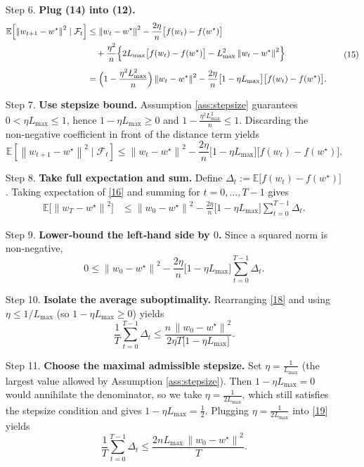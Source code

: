 \documentclass[11pt]{article}
\newcommand{\E}{\mathbb{E}}
\newcommand{\norm}[1]{\left\|#1\right\|}
\begin{document}
\begin{enumerate}
\item[Step 6.] \textbf{Plug (14) into (12).}
\[
\begin{aligned}
\E\!\left[\norm{w_{t+1}-w^{\star}}^{2}\mid\mathcal{F}_{t}\right]
&\le \norm{w_{t}-w^{\star}}^{2}
   -\frac{2\eta}{n}\bigl[f(w_{t})-f(w^{\star})\bigr] \\
&\quad +\frac{\eta^{2}}{n}\Bigl\{2L_{\max}\bigl[f(w_{t})-f(w^{\star})\bigr]
      -L_{\max}^{2}\norm{w_{t}-w^{\star}}^{2}\Bigr\}\\[1ex]
&= \Bigl(1-\frac{\eta^{2}L_{\max}^{2}}{n}\Bigr)\norm{w_{t}-w^{\star}}^{2}
   -\frac{2\eta}{n}\bigl[1-\eta L_{\max}\bigr]\bigl[f(w_{t})-f(w^{\star})\bigr].
\end{aligned}
\tag{15}
\]

\item[Step 7.] \textbf{Use stepsize bound.}  
Assumption \ref{ass:stepsize} guarantees $0<\eta L_{\max}\le1$, hence
$1-\eta L_{\max}\ge0$ and $1-\frac{\eta^{2}L_{\max}^{2}}{n}\le1$.
Discarding the non‑negative coefficient in front of the distance term yields
\[
\E\!\left[\norm{w_{t+1}-w^{\star}}^{2}\mid\mathcal{F}_{t}\right]
\le \norm{w_{t}-w^{\star}}^{2}
   -\frac{2\eta}{n}\bigl[1-\eta L_{\max}\bigr]\bigl[f(w_{t})-f(w^{\star})\bigr].
\tag{16}
\]

\item[Step 8.] \textbf{Take full expectation and sum.}
Define $\Delta_{t}:=\E\bigl[f(w_{t})-f(w^{\star})\bigr]$.
Taking expectation of \eqref{16} and summing for $t=0,\dots ,T-1$ gives
\[
\begin{aligned}
\E\!\bigl[\norm{w_{T}-w^{\star}}^{2}\bigr]
&\le \norm{w_{0}-w^{\star}}^{2}
   -\frac{2\eta}{n}\bigl[1-\eta L_{\max}\bigr]\sum_{t=0}^{T-1}\Delta_{t}.
\end{aligned}
\tag{17}
\]

\item[Step 9.] \textbf{Lower‑bound the left‑hand side by $0$.}
Since a squared norm is non‑negative,
\[
0\le \norm{w_{0}-w^{\star}}^{2}
   -\frac{2\eta}{n}\bigl[1-\eta L_{\max}\bigr]\sum_{t=0}^{T-1}\Delta_{t}.
\tag{18}
\]

\item[Step 10.] \textbf{Isolate the average suboptimality.}
Rearranging \eqref{18} and using $\eta\le 1/L_{\max}$ (so $1-\eta L_{\max}\ge 0$) yields
\[
\frac{1}{T}\sum_{t=0}^{T-1}\Delta_{t}
\le
\frac{n\,\norm{w_{0}-w^{\star}}^{2}}{2\eta T\bigl[1-\eta L_{\max}\bigr]}.
\tag{19}
\]

\item[Step 11.] \textbf{Choose the maximal admissible stepsize.}
Set $\eta = \frac{1}{L_{\max}}$ (the largest value allowed by Assumption
\ref{ass:stepsize}). Then $1-\eta L_{\max}=0$ would annihilate the denominator,
so we take $\eta=\frac{1}{2L_{\max}}$, which still satisfies the stepsize
condition and gives $1-\eta L_{\max}= \tfrac12$.
Plugging $\eta=\frac{1}{2L_{\max}}$ into \eqref{19} yields
\[
\frac{1}{T}\sum_{t=0}^{T-1}\Delta_{t}
\le
\frac{2nL_{\max}\,\norm{w_{0}-w^{\star}}^{2}}{T}.
\tag{20}
\]


\end{enumerate}
\end{document}
